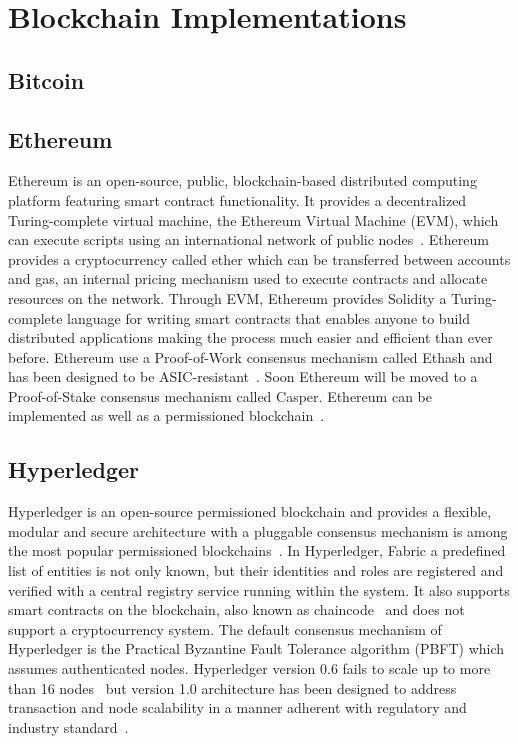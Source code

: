 \section{Blockchain Implementations}\label{blockchain_implementations}

\subsection{Bitcoin}\label{blockchain:impl:bitcoin}
\subsection{Ethereum}\label{blockchain:impl:ethereum}

Ethereum is an open-source, public, blockchain-based distributed computing platform featuring smart contract functionality.
It provides a decentralized Turing-complete virtual machine, the Ethereum Virtual Machine (EVM), which can execute scripts using an
international network of public nodes~\cite{wiki:ethereum}. Ethereum provides a cryptocurrency called ether which can be transferred between accounts and gas,
an internal pricing mechanism used to execute contracts and allocate resources on the network. Through EVM, Ethereum provides Solidity a
Turing-complete language for writing smart contracts that enables anyone to build distributed applications making the process much easier and efficient than ever before.
Ethereum use a Proof-of-Work consensus mechanism called Ethash and has been designed to be ASIC-resistant~\cite{ethash}.
Soon Ethereum will be moved to a Proof-of-Stake consensus mechanism called Casper. Ethereum can be implemented as well as a permissioned blockchain~\cite{consortium_chain_development,quorum}.


\subsection{Hyperledger}\label{blockchain:impl:hyperledger}

Hyperledger is an open-source permissioned blockchain and provides a flexible, modular and secure architecture with a
pluggable consensus mechanism is among the most popular permissioned blockchains~\cite{DBLP:journals/corr/abs-1708-05665}. In Hyperledger, Fabric a predefined list of
entities is not only known, but their identities and roles are registered and verified with a central registry service running within the system.
It also supports smart contracts on the blockchain, also known as chaincode~\cite{bl_consensus} and does not support a cryptocurrency system. The default consensus
mechanism of Hyperledger is the Practical Byzantine Fault Tolerance algorithm (PBFT) which assumes authenticated nodes.
Hyperledger version 0.6 fails to scale up to more than 16 nodes~\cite{DBLP:journals/corr/abs-1708-05665} but version 1.0 architecture has been designed to address transaction and
node scalability in a manner adherent with regulatory and industry standard~\cite{imb_hypeledger_adv}.

